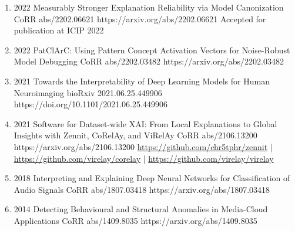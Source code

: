 \documentclass[10pt,a4paper]{article} %
\begin{document}
{\begin{enumerate}
        \item {}
                            {2022}
                            {Measurably Stronger Explanation Reliability via Model Canonization}
                            {CoRR abs/2202.06621}
                            {https://arxiv.org/abs/2202.06621}
                            {Accepted for publication at ICIP 2022}

        \item {}
                            {2022}
                            {PatClArC: Using Pattern Concept Activation Vectors for Noise-Robust Model Debugging}
                            {CoRR abs/2202.03482}
                            {https://arxiv.org/abs/2202.03482}

        \item {}
                            {2021}
                            {Towards the Interpretability of Deep Learning Models for Human Neuroimaging}
                            {bioRxiv 2021.06.25.449906}
                            {https://doi.org/10.1101/2021.06.25.449906}

        \item {}
                            {2021}
                            {Software for Dataset-wide XAI: From Local Explanations to Global Insights with Zennit, CoRelAy, and ViRelAy}
                            {CoRR abs/2106.13200}
                            {https://arxiv.org/abs/2106.13200}
                            {   \href{https://github.com/chr5tphr/zennit}{https://github.com/chr5tphr/zennit} | \\
                                \href{https://github.com/virelay/corelay}{https://github.com/virelay/corelay} |
                                \href{https://github.com/virelay/virelay}{https://github.com/virelay/virelay}
                            }

        \item {}
                            {2018}
                            {Interpreting and Explaining Deep Neural Networks for Classification of Audio Signals}
                            {CoRR abs/1807.03418}
                            {https://arxiv.org/abs/1807.03418}

        \item {}
                            {2014}
                            {Detecting Behavioural and Structural Anomalies in Media-Cloud Applications}
                            {CoRR abs/1409.8035}
                            {https://arxiv.org/abs/1409.8035}

    \end{enumerate}

}
\end{document}
